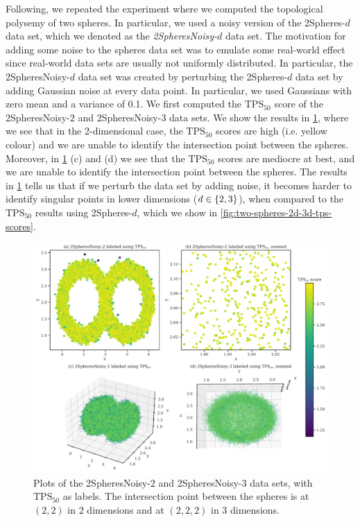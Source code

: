 Following, we repeated the experiment where we computed the topological polysemy of two spheres. In particular, we used a noisy version of the 2Spheres-$d$ data set, which we denoted as the \textit{2SpheresNoisy-$d$} data set. The motivation for adding some noise to the spheres data set was to emulate some real-world effect since real-world data sets are usually not uniformly distributed. In particular, the 2SpheresNoisy-$d$ data set was created by perturbing the 2Spheres-$d$ data set by adding Gaussian noise at every data point. In particular, we used Gaussians with zero mean and a variance of 0.1. We first computed the $\text{TPS}_{50}$ score of the 2SpheresNoisy-$2$ and 2SpheresNoisy-$3$ data sets. We show the results in \cref{fig:two-spheres-noisy-2d-3d-tps-scores}, where we see that in the 2-dimensional case, the $\text{TPS}_{50}$ scores are high (i.e. yellow colour) and we are unable to identify the intersection point between the spheres. Moreover, in \cref{fig:two-spheres-noisy-2d-3d-tps-scores} (c) and (d) we see that the $\text{TPS}_{50}$ scores are mediocre at best, and we are unable to identify the intersection point between the spheres. The results in \cref{fig:two-spheres-noisy-2d-3d-tps-scores} tells us that if we perturb the data set by adding noise, it becomes harder to identify singular points in lower dimensions ($d \in \left\{2, 3\right\}$), when compared to the $\text{TPS}_{50}$ results using 2Spheres-$d$, which we show in \cref{fig:two-spheres-2d-3d-tps-scores}.
\begin{figure}[H]
    \centering
    \includegraphics[width=\textwidth]{thesis/figures/two-spheres-noisy-2d-3d-tps-scores.pdf}
    \caption{Plots of the 2SpheresNoisy-$2$ and 2SpheresNoisy-$3$ data sets, with $\text{TPS}_{50}$ as labels. The intersection point between the spheres is at $(2, 2)$ in 2 dimensions and at $(2, 2, 2)$ in 3 dimensions.}
    \label{fig:two-spheres-noisy-2d-3d-tps-scores}
\end{figure}

